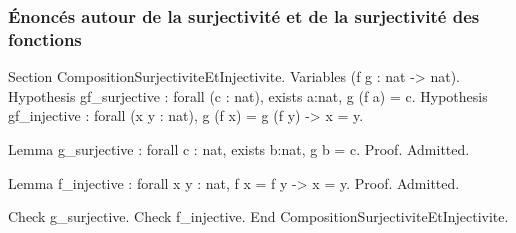 \documentclass[a4paper,10pt]{article}
\begin{document}
\subsubsection{Énoncés autour de la surjectivité et de la surjectivité des fonctions}
\label{sec:org06217fd}

\begin{coq}[]
Section CompositionSurjectiviteEtInjectivite.
Variables (f g : nat -> nat).
Hypothesis gf_surjective : forall (c : nat), exists a:nat, g (f a) = c.
Hypothesis gf_injective : forall (x y : nat),  g (f x) = g (f y) -> x = y.

Lemma g_surjective : forall c : nat, exists b:nat, g b = c.
Proof.
Admitted.

Lemma f_injective : forall x y : nat, f x = f y -> x = y.
Proof.
Admitted.

Check g_surjective.
Check f_injective.
End CompositionSurjectiviteEtInjectivite.
\end{coq}
\end{document}
